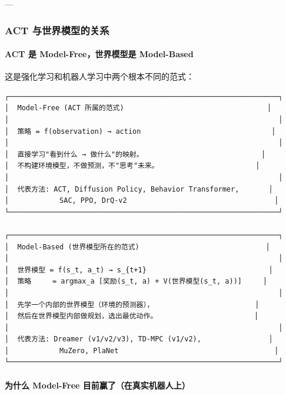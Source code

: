 \documentclass[UTF8,a4paper,11pt]{ctexart}
\begin{document}
{---

\subsubsection{ACT 与世界模型的关系}

\paragraph{ACT 是 Model-Free，世界模型是 Model-Based}


这是强化学习和机器人学习中两个根本不同的范式：

\begin{lstlisting}[language=text]
┌────────────────────────────────────────────────────────────────┐
│  Model-Free (ACT 所属的范式)                                  │
│                                                                │
│  策略 = f(observation) → action                               │
│                                                                │
│  直接学习"看到什么 → 做什么"的映射。                            │
│  不构建环境模型，不做预测，不"思考"未来。                       │
│                                                                │
│  代表方法: ACT, Diffusion Policy, Behavior Transformer,       │
│            SAC, PPO, DrQ-v2                                   │
└────────────────────────────────────────────────────────────────┘

┌────────────────────────────────────────────────────────────────┐
│  Model-Based (世界模型所在的范式)                              │
│                                                                │
│  世界模型 = f(s_t, a_t) → s_{t+1}                             │
│  策略     = argmax_a [奖励(s_t, a) + V(世界模型(s_t, a))]     │
│                                                                │
│  先学一个内部的世界模型（环境的预测器），                        │
│  然后在世界模型内部做规划，选出最优动作。                       │
│                                                                │
│  代表方法: Dreamer (v1/v2/v3), TD-MPC (v1/v2),                │
│            MuZero, PlaNet                                     │
└────────────────────────────────────────────────────────────────┘
\end{lstlisting}

\paragraph{为什么 Model-Free 目前赢了（在真实机器人上）}


}
\end{document}
